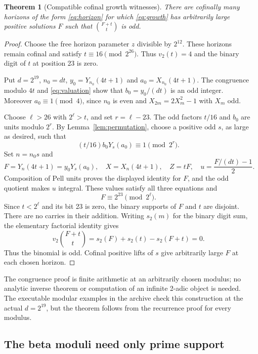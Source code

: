 \documentclass[11pt,a4paper]{article}
\newtheorem{theorem}{Theorem}[section]
\theoremstyle{remark}\newtheorem{remark}[theorem]{Remark}
\newcommand{\vp}{v_2}
\begin{document}
\begin{theorem}[Compatible cofinal growth witnesses]\label{thm:cofinal}
There are cofinally many horizons of the form \eqref{eq:horizon} for which
\eqref{eq:growth} has arbitrarily large positive solutions $F$ such that
$\binom{F+t}{t}$ is odd.
\end{theorem}
\begin{proof}
Choose the free horizon parameter $z$ divisible by $2^{12}$. These horizons
remain cofinal and satisfy $t\equiv16\pmod{2^{26}}$. Thus $\vp(t)=4$ and
the binary digit of $t$ at position 23 is zero.

Put $d=2^{19}$, $n_0=dt$, $y_0=Y_{n_0}(4t+1)$ and
$a_0=X_{n_0}(4t+1)$. The congruence modulo $4t$ and
\eqref{eq:valuation} show that $b_0=y_0/(dt)$ is an odd integer.
Moreover $a_0\equiv1\pmod4$, since $n_0$ is even and
$X_{2m}=2X_m^2-1$ with $X_m$ odd.

Choose $\ell>26$ with $2^\ell>t$, and set $r=\ell-23$. The odd factors
$t/16$ and $b_0$ are units modulo $2^r$. By Lemma~\ref{lem:permutation},
choose a positive odd $s$, as large as desired, such that
\[
(t/16)b_0Y_s(a_0)\equiv1\pmod{2^r}.
\]
Set $n=n_0s$ and
\[
F=Y_n(4t+1)=y_0Y_s(a_0),\quad X=X_n(4t+1),\quad Z=tF,
\quad u=\frac{F/(dt)-1}{2}.
\]
Composition of Pell units proves the displayed identity for $F$, and the odd
quotient makes $u$ integral. These values satisfy all three equations and
\begin{equation}\label{eq:binarytarget}
F\equiv2^{23}\pmod{2^\ell}.
\end{equation}
Since $t<2^\ell$ and its bit 23 is zero, the binary supports of $F$ and $t$
are disjoint. There are no carries in their addition. Writing $s_2(m)$ for
the binary digit sum, the elementary factorial identity gives
\[
\vp\binom{F+t}{t}=s_2(F)+s_2(t)-s_2(F+t)=0.
\]
Thus the binomial is odd. Cofinal positive lifts of $s$ give arbitrarily
large $F$ at each chosen horizon.
\end{proof}

The congruence proof is finite arithmetic at an arbitrarily chosen modulus;
no analytic inverse theorem or computation of an infinite 2-adic object is
needed. The executable modular examples in the archive check this construction
at the actual $d=2^{19}$, but the theorem follows from the recurrence proof
for every modulus.

\subsection{The beta moduli need only prime support}
\end{document}
